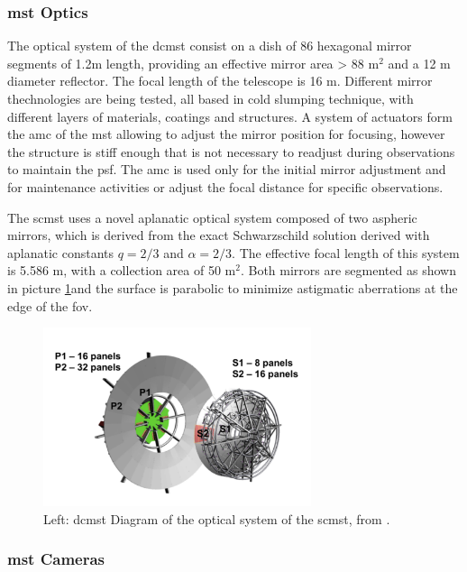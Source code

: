 \documentclass[main.tex]{subfiles}
\begin{document}
\subsubsection{\gls{mst} Optics}

The optical system of the \gls{dcmst} consist on a dish of 86 hexagonal mirror segments of 1.2m length, providing an effective mirror area > 88 m$^2$ and a 12 m diameter reflector. The focal length of the telescope is 16 m.
Different mirror thechnologies are being tested, all based in cold slumping technique, with different layers of materials, coatings and structures. A system of actuators form the \gls{amc} of the \gls{mst} allowing to adjust the mirror position for focusing, however the structure is stiff enough that is not necessary to readjust during observations to maintain the \gls{psf}. The \gls{amc} is used only for the initial mirror adjustment and for maintenance activities or adjust the focal distance for specific observations.

The \gls{scmst} uses a novel aplanatic optical system composed of two aspheric mirrors, which is derived from the exact Schwarzschild solution derived with aplanatic constants $q=2/3$ and $\alpha = 2/3$. The effective focal length of this system is 5.586 m, with a collection area of 50 m$^2$. Both mirrors are segmented as shown in picture \ref{fig:SCMSTmirrors}and the surface is parabolic to minimize astigmatic aberrations at the edge of the \gls{fov}. 


\begin{figure}
\centering
 \includegraphics[width=0.7\textwidth]{Pictures/SCMSTMirrors.pdf}
  \caption{Left: \gls{dcmst} Diagram of the optical system of the \gls{scmst}, from \cite{2017SCMSTstatus}.}
    \label{fig:SCMSTmirrors}
\end{figure}

\subsubsection{\gls{mst} Cameras}
\end{document}
